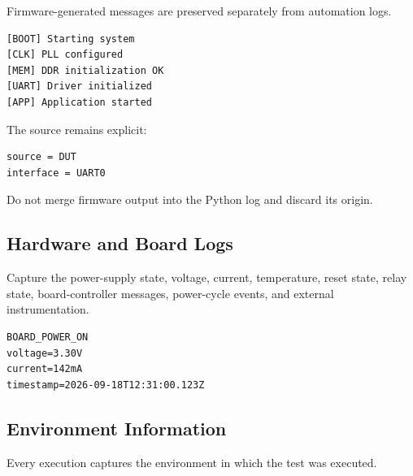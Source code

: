 \documentclass[
  11pt,
  letterpaper,
  DIV=11,
  numbers=noendperiod]{scrartcl}
\begin{document}
Firmware-generated messages are preserved separately from automation
logs.

\begin{verbatim}
[BOOT] Starting system
[CLK] PLL configured
[MEM] DDR initialization OK
[UART] Driver initialized
[APP] Application started
\end{verbatim}

The source remains explicit:

\begin{verbatim}
source = DUT
interface = UART0
\end{verbatim}

Do not merge firmware output into the Python log and discard its origin.

\subsection{Hardware and Board Logs}\label{hardware-and-board-logs}

Capture the power-supply state, voltage, current, temperature, reset
state, relay state, board-controller messages, power-cycle events, and
external instrumentation.

\begin{verbatim}
BOARD_POWER_ON
voltage=3.30V
current=142mA
timestamp=2026-09-18T12:31:00.123Z
\end{verbatim}

\subsection{Environment Information}\label{environment-information}

Every execution captures the environment in which the test was executed.
\end{document}

